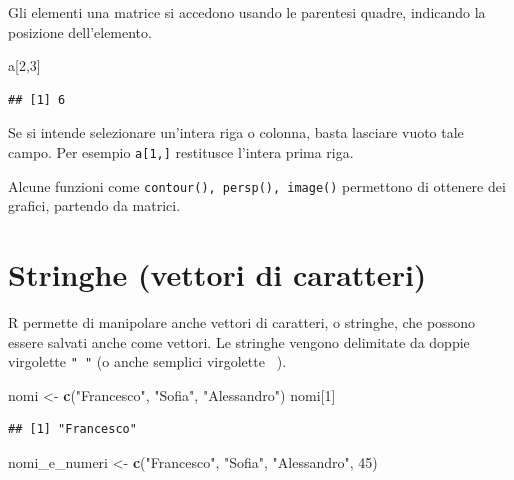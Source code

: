 \documentclass[]{book}
\newenvironment{Shaded}{\begin{snugshade}}{\end{snugshade}}
\newcommand{\DecValTok}[1]{\textcolor[rgb]{0.00,0.00,0.81}{#1}}
\newcommand{\KeywordTok}[1]{\textcolor[rgb]{0.13,0.29,0.53}{\textbf{#1}}}
\newcommand{\NormalTok}[1]{#1}
\newcommand{\StringTok}[1]{\textcolor[rgb]{0.31,0.60,0.02}{#1}}
\begin{document}
Gli elementi una matrice si accedono usando le parentesi quadre, indicando la posizione dell'elemento.

\begin{Shaded}
\begin{Highlighting}[]
\NormalTok{a[}\DecValTok{2}\NormalTok{,}\DecValTok{3}\NormalTok{]}
\end{Highlighting}
\end{Shaded}

\begin{verbatim}
## [1] 6
\end{verbatim}

Se si intende selezionare un'intera riga o colonna, basta lasciare vuoto tale campo. Per esempio \texttt{a{[}1,{]}} restitusce l'intera prima riga.

Alcune funzioni come \texttt{contour(),\ persp(),\ image()} permettono di ottenere dei grafici, partendo da matrici.

\hypertarget{stringhe-vettori-di-caratteri}{%
\section{Stringhe (vettori di caratteri)}\label{stringhe-vettori-di-caratteri}}

R permette di manipolare anche vettori di caratteri, o stringhe, che possono essere salvati anche come vettori. Le stringhe vengono delimitate da doppie virgolette \texttt{"\ "} (o anche semplici virgolette \texttt{\textquotesingle{}\ \textquotesingle{}}).

\begin{Shaded}
\begin{Highlighting}[]
\NormalTok{nomi <-}\StringTok{ }\KeywordTok{c}\NormalTok{(}\StringTok{"Francesco"}\NormalTok{, }\StringTok{"Sofia"}\NormalTok{, }\StringTok{"Alessandro"}\NormalTok{)}
\NormalTok{nomi[}\DecValTok{1}\NormalTok{]}
\end{Highlighting}
\end{Shaded}

\begin{verbatim}
## [1] "Francesco"
\end{verbatim}

\begin{Shaded}
\begin{Highlighting}[]
\NormalTok{nomi_e_numeri <-}\StringTok{ }\KeywordTok{c}\NormalTok{(}\StringTok{"Francesco"}\NormalTok{, }\StringTok{"Sofia"}\NormalTok{, }\StringTok{"Alessandro"}\NormalTok{, }\DecValTok{45}\NormalTok{)}
\end{Highlighting}
\end{Shaded}
\end{document}
